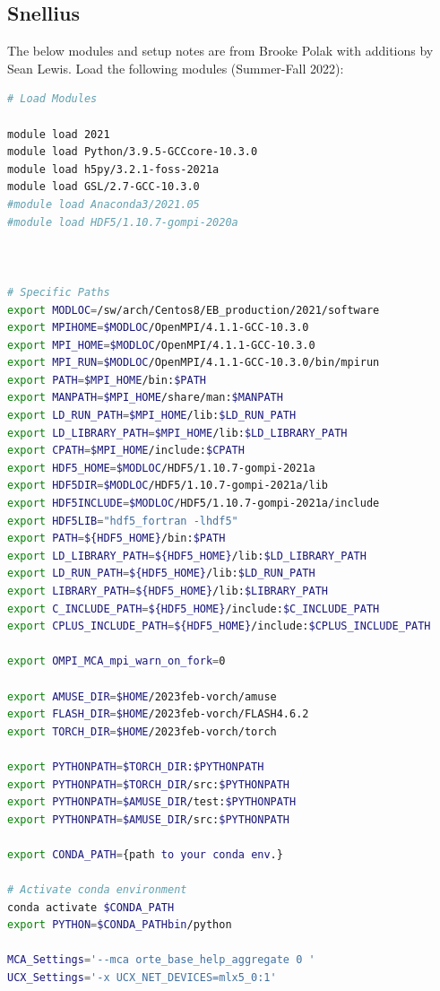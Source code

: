 \documentclass[10pt]{article}
\begin{document}
\subsection{Snellius}
The below modules and setup notes are from Brooke Polak with additions by Sean Lewis.
Load the following modules (Summer-Fall 2022):
\begin{lstlisting}[language=bash]
# Load Modules

module load 2021
module load Python/3.9.5-GCCcore-10.3.0
module load h5py/3.2.1-foss-2021a
module load GSL/2.7-GCC-10.3.0
#module load Anaconda3/2021.05
#module load HDF5/1.10.7-gompi-2020a



# Specific Paths
export MODLOC=/sw/arch/Centos8/EB_production/2021/software
export MPIHOME=$MODLOC/OpenMPI/4.1.1-GCC-10.3.0
export MPI_HOME=$MODLOC/OpenMPI/4.1.1-GCC-10.3.0
export MPI_RUN=$MODLOC/OpenMPI/4.1.1-GCC-10.3.0/bin/mpirun
export PATH=$MPI_HOME/bin:$PATH
export MANPATH=$MPI_HOME/share/man:$MANPATH
export LD_RUN_PATH=$MPI_HOME/lib:$LD_RUN_PATH
export LD_LIBRARY_PATH=$MPI_HOME/lib:$LD_LIBRARY_PATH
export CPATH=$MPI_HOME/include:$CPATH
export HDF5_HOME=$MODLOC/HDF5/1.10.7-gompi-2021a
export HDF5DIR=$MODLOC/HDF5/1.10.7-gompi-2021a/lib
export HDF5INCLUDE=$MODLOC/HDF5/1.10.7-gompi-2021a/include
export HDF5LIB="hdf5_fortran -lhdf5"
export PATH=${HDF5_HOME}/bin:$PATH
export LD_LIBRARY_PATH=${HDF5_HOME}/lib:$LD_LIBRARY_PATH
export LD_RUN_PATH=${HDF5_HOME}/lib:$LD_RUN_PATH
export LIBRARY_PATH=${HDF5_HOME}/lib:$LIBRARY_PATH
export C_INCLUDE_PATH=${HDF5_HOME}/include:$C_INCLUDE_PATH
export CPLUS_INCLUDE_PATH=${HDF5_HOME}/include:$CPLUS_INCLUDE_PATH

export OMPI_MCA_mpi_warn_on_fork=0

export AMUSE_DIR=$HOME/2023feb-vorch/amuse
export FLASH_DIR=$HOME/2023feb-vorch/FLASH4.6.2
export TORCH_DIR=$HOME/2023feb-vorch/torch

export PYTHONPATH=$TORCH_DIR:$PYTHONPATH
export PYTHONPATH=$TORCH_DIR/src:$PYTHONPATH
export PYTHONPATH=$AMUSE_DIR/test:$PYTHONPATH
export PYTHONPATH=$AMUSE_DIR/src:$PYTHONPATH

export CONDA_PATH={path to your conda env.}

# Activate conda environment
conda activate $CONDA_PATH
export PYTHON=$CONDA_PATHbin/python

MCA_Settings='--mca orte_base_help_aggregate 0 '
UCX_Settings='-x UCX_NET_DEVICES=mlx5_0:1'
\end{lstlisting}
\end{document}
